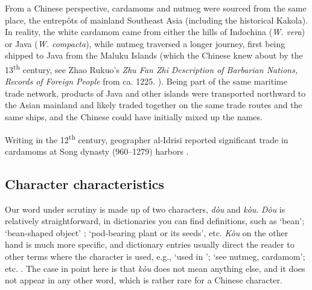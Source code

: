 \documentclass[12pt]{article}
\newcommand{\tc}[1]{\traditionalchinesefont{#1}\rmfamily}
\begin{document}

From a Chinese perspective, cardamoms and nutmeg were sourced from the same place, the entrepôts of mainland Southeast Asia (including the historical Kakola). In reality, the white cardamom came from either the hills of Indochina (\textit{W. vera}) or Java (\textit{W. compacta}), while nutmeg traversed a longer journey, first being shipped to Java from the Maluku Islands (which the Chinese knew about by the 13\textsuperscript{th} century, see Zhao Rukuo's \tc{諸蕃志} \textit{Zhu Fan Zhi} \textit{Description of Barbarian Nations, Records of Foreign People} from ca. 1225. \parencite[210]{hirth_1911_chau}). Being part of the same maritime trade network, products of Java and other islands were transported northward to the Asian mainland and likely traded together on the same trade routes and the same ships, and the Chinese could have initially mixed up the names.


Writing in the 12\textsuperscript{th} century, geographer al-Idrisi reported significant trade in cardamoms at Song dynasty (960--1279) harbors \parencite{prance_2005_cultural}.



\subsection{Character characteristics}

Our word under scrutiny is made up of two characters, \tc{豆} \textit{dòu} and \tc{蔻} \textit{kòu}. \textit{Dòu} is relatively straightforward, in dictionaries you can find definitions, such as `bean'; `bean-shaped object' \parencite[179]{kleeman_2010_oxford}; `pod-bearing plant or its seeds', etc. \textit{Kòu} on the other hand is much more specific, and dictionary entries usually direct the reader to other terms where the character is used, e.g., `used in \tc{豆蔻}'; `see \tc{豆蔻} nutmeg, cardamom'; etc. \parencite{mdbg}. The case in point here is that \textit{kòu} does not mean anything else, and it does not appear in any other word, which is rather rare for a Chinese character.
\end{document}
